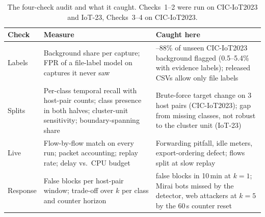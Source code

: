 \begin{table}[t]
\centering
\caption{The four-check audit and what it caught. Checks~1--2 were run on CIC-IoT2023 and IoT-23, Checks~3--4 on CIC-IoT2023.}
\label{tab:checklist}
\footnotesize
\setlength{\tabcolsep}{3pt}
\begin{tabular}{>{\raggedright\arraybackslash}p{1.1cm}>{\raggedright\arraybackslash}p{3.4cm}>{\raggedright\arraybackslash}p{3.5cm}}
\hline
Check & Measure & Caught here \\
\hline
1 Labels & Background share per capture; FPR of a file-label model on captures it never saw & 71--88\% of unseen CIC-IoT2023 background flagged (0.5--5.4\% with evidence labels); released CSVs allow only file labels \\
2 Splits & Per-class temporal recall with host-pair counts; class presence in both halves; cluster-unit sensitivity; boundary-spanning share & Brute-force target change on 3 host pairs (CIC-IoT2023); gap from missing classes, not robust to the cluster unit (IoT-23) \\
3 Live & Flow-by-flow match on every run; packet accounting; replay rate; delay vs.\ CPU budget & Forwarding pitfall, idle meters, export-ordering defect; flows split at slow replay \\
4 Response & False blocks per host-pair window; trade-off over $k$ per class and counter horizon & 60 false blocks in 10\,min at $k=1$; Mirai bots missed by the detector, web attackers at $k=5$ by the 60\,s counter reset \\
\hline
\end{tabular}
\end{table}
